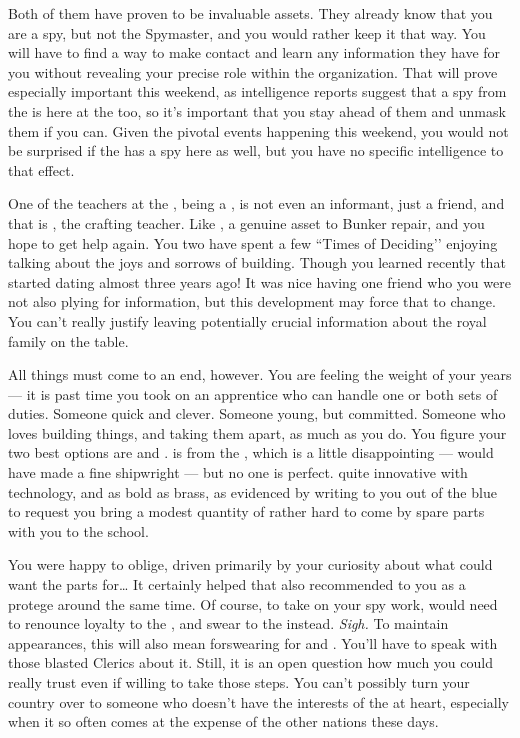 \documentclass[char]{GL2020}
\begin{document}
Both of them have proven to be invaluable assets. They already know that you are a \pShip{} spy, but not the Spymaster, and you would rather keep it that way. You will have to find a way to make contact and learn any information they have for you without revealing your precise role within the organization. That will prove especially important this weekend, as intelligence reports suggest that a spy from the \pFarm{} is here at the \pSc{} too, so it's important that you stay ahead of them and unmask them if you can. Given the pivotal events happening this weekend, you would not be surprised if the \pTech{} has a spy here as well, but you have no specific intelligence to that effect.

One of the teachers at the \pSc{}, being a \pShippie{}, is not even an informant, just a friend, and that is \cPirate{\intro}, the crafting teacher. Like \cChupInventor{}, \cPirate{\theyare} a genuine asset to Bunker repair, and you hope to get \cPirate{\their} help again. You two have spent a few ``Times of Deciding’’ enjoying talking about the joys and sorrows of building. Though you learned recently that \cPirate{\they} started dating \cPrince{\intro} almost three years ago! It was nice having one friend who you were not also plying for information, but this development may force that to change. You can’t really justify leaving potentially crucial information about the \pFarm{} royal family on the table.

All things must come to an end, however. You are feeling the weight of your years — it is past time you took on an apprentice who can handle one or both sets of duties. Someone quick and clever. Someone young, but committed. Someone who loves building things, and taking them apart, as much as you do. You figure your two best options are \cTechStar{\intro} and \cInitiate{\intro}. \cTechStar{} is from the \pTech{}, which is a little disappointing — \cTechStar{\they} would have made a fine shipwright — but no one is perfect. \cTechStar{\Theyare} quite innovative with technology, and as bold as brass, as evidenced by \cTechStar{\their} writing to you out of the blue to request you bring a modest quantity of rather hard to come by spare parts with you to the school. 

You were happy to oblige, driven primarily by your curiosity about what \cTechStar{\they} could want the parts for\ldots{} It certainly helped that \cChupInventor{} also recommended \cTechStar{\them} to you as a protege around the same time. Of course, to take on your spy work, \cTechStar{} would need to renounce loyalty to the \pTech{}, and swear to the \pShip{} instead. \emph{Sigh.} To maintain appearances, this will also mean forswearing \cTechGod{\intro} for \cEbb{} and \cFlowFull{\intro}. You'll have to speak with those blasted Clerics about it. Still, it is an open question how much you could really trust \cTechStar{} even if \cTechStar{\theyare} willing to take those steps. You can't possibly turn your country over to someone who doesn't have the interests of the \pShip{} at heart, especially when it so often comes at the expense of the other nations these days.
\end{document}
